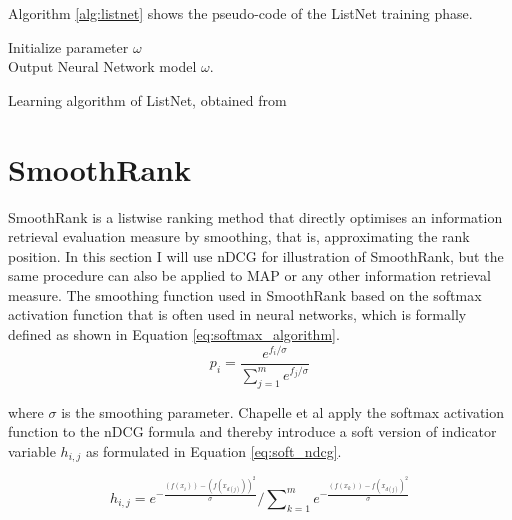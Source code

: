\noindent Algorithm \ref{alg:listnet} shows the pseudo-code of the ListNet training phase.\\
\LinesNumbered
\begin{algorithm}[H]
 Initialize parameter $\omega$\\
 Output Neural Network model $\omega$.
 \caption{Learning algorithm of ListNet, obtained from \cite{Cao2007}}
 \label{alg:listnet}
\end{algorithm}

\section{SmoothRank}
SmoothRank \cite{Chapelle2010} is a listwise ranking method that directly optimises an information retrieval evaluation measure by smoothing, that is, approximating the rank position. In this section I will use \ac{nDCG} for illustration of SmoothRank, but the same procedure can also be applied to \ac{MAP} or any other information retrieval measure. The smoothing function used in SmoothRank based on the softmax activation function \cite{Bridle1990} that is often used in neural networks, which is formally defined as shown in Equation \ref{eq:softmax_algorithm}.
\begin{equation}
p_i = \frac{e^{f_i/\sigma}}{\sum\nolimits_{j=1}^{m}e^{f_j/\sigma}}
\label{eq:softmax_algorithm}
\end{equation}

where $\sigma$ is the smoothing parameter. Chapelle et al \cite{Chapelle2010} apply the softmax activation function to the \ac{nDCG} formula and thereby introduce a soft version of indicator variable $h_{i,j}$ as formulated in Equation \ref{eq:soft_ndcg}.

\begin{equation}
h_{i,j} = e^{-\frac{(f(x_i))-(f(x_{d(j)}))^2}{\sigma}}\Big/\sum\nolimits_{k=1}^{m}e^{-\frac{(f(x_k))-f(x_{d(j)})^2}{\sigma}}
\label{eq:soft_ndcg}
\end{equation}

